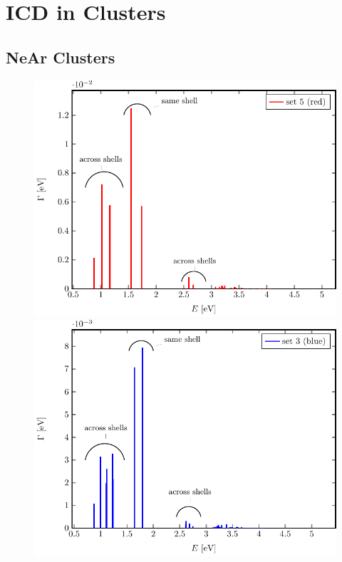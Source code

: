 \section{ICD in Clusters}
\label{sec:clusters}

\subsection{NeAr Clusters}
\label{sec:near}
\begin{figure}[h]
 \centering
 \includegraphics[width=\columnwidth]{pics/rot.pdf}\\
 \includegraphics[width=\columnwidth]{pics/blue.pdf}

\end{figure}
